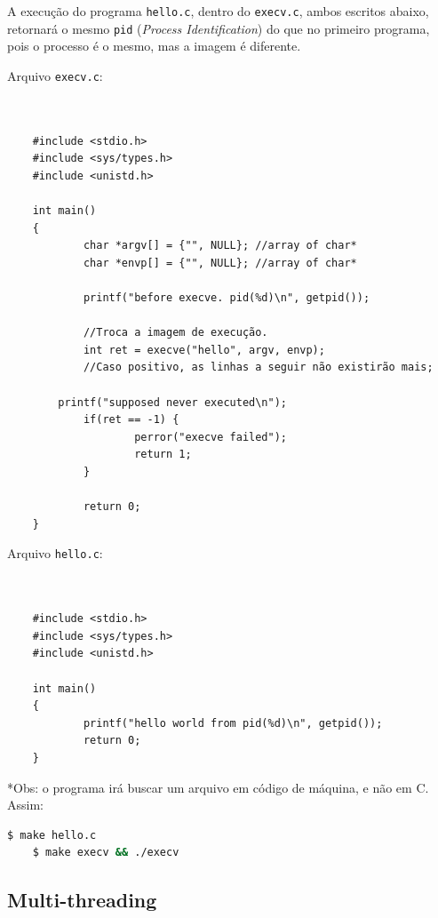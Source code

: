 A execução do programa \texttt{hello.c}, dentro do \texttt{execv.c},
ambos escritos abaixo, retornará o mesmo \texttt{pid} (\emph{Process
Identification}) do que no primeiro programa, pois o processo é o mesmo,
mas a imagem é diferente.

Arquivo \texttt{execv.c}:


\begin{verbatim}


    #include <stdio.h>
    #include <sys/types.h>
    #include <unistd.h>
    
    int main()
    {
            char *argv[] = {"", NULL}; //array of char*
            char *envp[] = {"", NULL}; //array of char*
            
            printf("before execve. pid(%d)\n", getpid());
            
            //Troca a imagem de execução.
            int ret = execve("hello", argv, envp); 
            //Caso positivo, as linhas a seguir não existirão mais;
            
        printf("supposed never executed\n");
            if(ret == -1) {
                    perror("execve failed");
                    return 1;
            }
            
            return 0;
    }

\end{verbatim}

Arquivo \texttt{hello.c}:


\begin{verbatim}


    #include <stdio.h>
    #include <sys/types.h>
    #include <unistd.h>
    
    int main()
    {
            printf("hello world from pid(%d)\n", getpid());
            return 0;
    }

\end{verbatim}



*Obs: o programa irá buscar um arquivo em código de máquina, e não em C.
Assim:

\begin{lstlisting}[language=bash]
    $ make hello.c
    $ make execv && ./execv
\end{lstlisting}


\hypertarget{multi-threading}{%
\subsection{Multi-threading}\label{multi-threading}}

